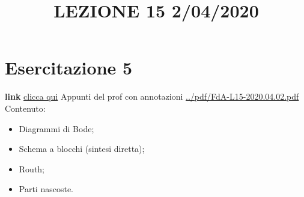 \section{Esercitazione 5}
\title{LEZIONE 15 2/04/2020}\newline
\textbf{link} \href{https://web.microsoftstream.com/video/208fe47d-34d0-49da-8f31-916e1297a91b?list=user&userId=faa91214-a6f5-40d7-8875-253fd49b8ce1}{clicca qui}\newline
\newline
Appunti del prof con annotazioni \url{../pdf/FdA-L15-2020.04.02.pdf}\newline
Contenuto:
\begin{itemize}
    \item Diagrammi di Bode;
    \item Schema a blocchi (sintesi diretta);
    \item Routh;
    \item Parti nascoste.
\end{itemize}